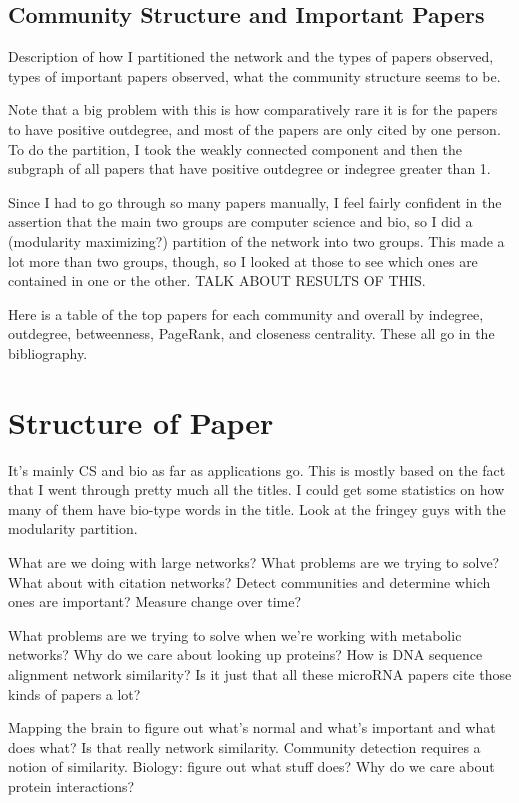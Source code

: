 \documentclass[12pt]{thesis}
\theoremstyle{plain}
\theoremstyle{definition}
\theoremstyle{remark}
\begin{document}
\subsection{Community Structure and Important Papers}

Description of how I partitioned the network and the types of papers observed, types of important papers observed, what the community structure seems to be.

Note that a big problem with this is how comparatively rare it is for the papers to have positive outdegree, and most of the papers are only cited by one person. To do the partition, I took the weakly connected component and then the subgraph of all papers that have positive outdegree or indegree greater than 1. 

Since I had to go through so many papers manually, I feel fairly confident in the assertion that the main two groups are computer science and bio, so I did a (modularity maximizing?) partition of the network into two groups. This made a lot more than two groups, though, so I looked at those to see which ones are contained in one or the other. TALK ABOUT RESULTS OF THIS.

Here is a table of the top papers for each community and overall by indegree, outdegree, betweenness, PageRank, and closeness centrality. These all go in the bibliography.

\section{Structure of Paper} %

It's mainly CS and bio as far as applications go. This is mostly based on the fact that I went through pretty much all the titles. I could get some statistics on how many of them have bio-type words in the title. Look at the fringey guys with the modularity partition.

What are we doing with large networks? What problems are we trying to solve? What about with citation networks? Detect communities and determine which ones are important? Measure change over time?

What problems are we trying to solve when we're working with metabolic networks? Why do we care about looking up proteins? How is DNA sequence alignment network similarity? Is it just that all these microRNA papers cite those kinds of papers a lot? 

Mapping the brain to figure out what's normal and what's important and what does what? Is that really network similarity. Community detection requires a notion of similarity. Biology: figure out what stuff does? Why do we care about protein interactions? 
\end{document}
